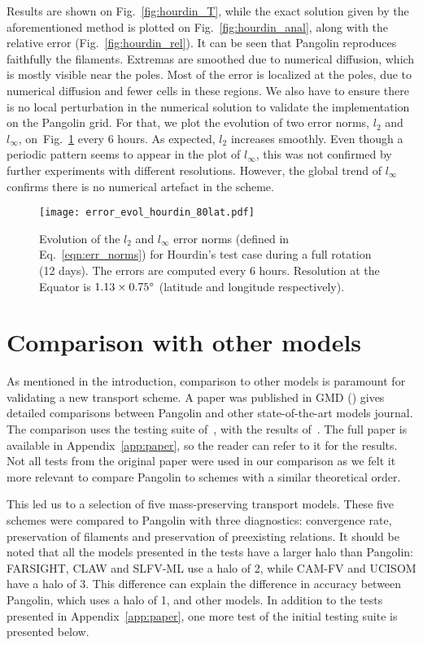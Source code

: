 Results are shown on Fig.~\ref{fig:hourdin_T}, while the exact solution given by
the aforementioned method is plotted on Fig.~\ref{fig:hourdin_anal}, along with
the relative error (Fig.~\ref{fig:hourdin_rel}). It can be seen that Pangolin
reproduces faithfully the filaments. Extremas are smoothed due to numerical
diffusion, which is mostly visible near the poles. Most of the error is
localized at the poles, due to numerical diffusion and fewer cells in these
regions.  We also have to ensure there is no local perturbation in the numerical
solution to validate the implementation on the Pangolin grid. For that, we plot
the evolution of two error norms, $l_2$ and $l_{\infty}$,
on~Fig.~\ref{fig:error_hourdin} every 6 hours. As expected, $l_2$ increases
smoothly. Even though a periodic pattern seems to appear in the plot of
$l_{\infty}$, this was not confirmed by further experiments with different
resolutions. However, the global trend of $l_{\infty}$ confirms there is no
numerical artefact in the scheme.
\begin{figure}
  \centering
  \texttt{[image: error\_evol\_hourdin\_80lat.pdf]}
  \caption{Evolution of the $l_2$ and $l_{\infty}$ error norms (defined in
  Eq.~\eqref{eqn:err_norms}) for Hourdin's test case during a full rotation (12
  days). The errors are computed every 6 hours. Resolution at the Equator is 
  $1.13\times0.75^{\circ}$ (latitude and longitude respectively).}
\label{fig:error_hourdin}
\end{figure}

\section{Comparison with other models}
\label{sec:comparison}
As mentioned in the introduction, comparison to other models is paramount for
validating a new transport scheme. A paper was published in \gls{GMD}
(\cite{Praga2015}) gives detailed comparisons between Pangolin and other
state-of-the-art models journal. The comparison uses the testing suite
of~\cite{Lauritzen2012}, with the results of~\cite{Lauritzen2014}. The full
paper is available in Appendix~\ref{app:paper}, so the reader can refer to it
for the results. Not all tests from the original paper were used in our
comparison as we felt it more relevant to compare Pangolin to schemes with a
similar theoretical order. 

This led us to a selection of five mass-preserving transport models. These 
five schemes were compared to Pangolin with three diagnostics: convergence
rate, preservation of filaments and preservation of preexisting
relations. It should be noted that all the models presented in the tests have a
larger halo than Pangolin: FARSIGHT, CLAW and SLFV-ML use a halo of 2, while
CAM-FV and UCISOM have a halo of 3. This difference can explain the difference
in accuracy between Pangolin, which uses a halo of 1, and other models.
In addition to the tests presented in Appendix~\ref{app:paper}, one more test
of the initial testing suite is presented below.

